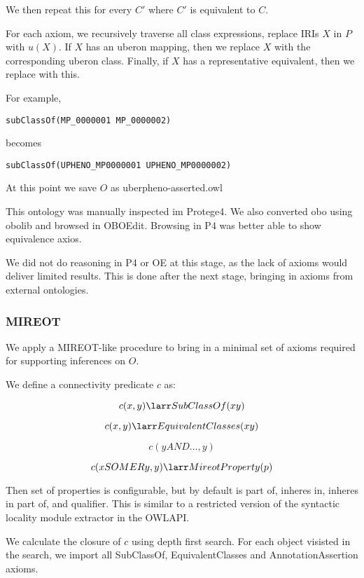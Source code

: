 We then repeat this for every $C'$ where $C'$ is equivalent to $C$.

For each axiom, we recursively traverse all class expressions, replace
IRIs $X$ in $P$ with $u(X)$. If $X$ has an uberon mapping,
then we replace $X$ with the corresponding uberon class. Finally,
if $X$ has a representative equivalent, then we replace with this.

For example,

\begin{verbatim}
subClassOf(MP_0000001 MP_0000002)
\end{verbatim}

becomes

\begin{verbatim}
subClassOf(UPHENO_MP0000001 UPHENO_MP0000002)
\end{verbatim}



At this point we save $O$ as uberpheno-asserted.owl

This ontology was manually inspected im Protege4. We also converted
obo using obolib and browsed in OBOEdit. Browsing in P4 was better
able to show equivalence axios.

We did not do reasoning in P4 or OE at this stage, as the lack of
axioms would deliver limited results. This is done after the next
stage, bringing in axioms from external ontologies.

\subsubsection{MIREOT}

We apply a MIREOT-like procedure to bring in a minimal set of axioms
required for supporting inferences on $O$.

We define a connectivity predicate $c$ as:

$$
c(x,y) \larr SubClassOf(x y)
$$

$$
c(x,y) \larr EquivalentClasses(x y)
$$

$$
c(y AND ...,y)
$$

$$
c(x SOME R y,y) \larr MireotProperty(p)
$$

Then set of properties is configurable, but by default is part of,
inheres in, inheres in part of, and qualifier. This is similar to a
restricted version of the syntactic locality module extractor in the
OWLAPI.

We calculate the closure of $c$ using depth first search. For each
object visisted in the search, we import all SubClassOf,
EquivalentClasses and AnnotationAssertion axioms.

